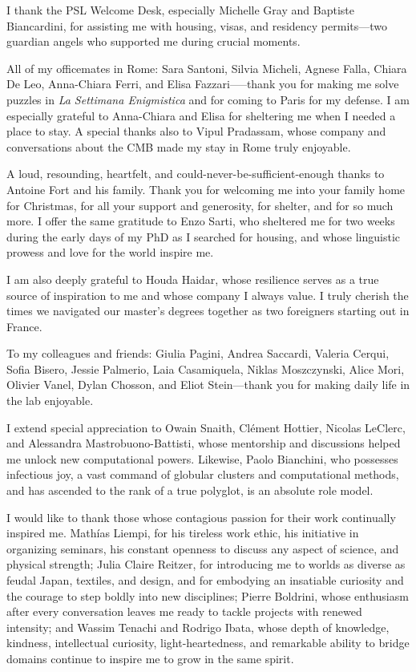 I thank the PSL Welcome Desk, especially Michelle Gray and Baptiste Biancardini, for assisting me with housing, visas, and residency permits—two guardian angels who supported me during crucial moments. 

All of my officemates in Rome: Sara Santoni, Silvia Micheli, Agnese Falla, Chiara De Leo, Anna-Chiara Ferri, and Elisa Fazzari—--thank you for making me solve puzzles in \textit{La Settimana Enigmistica} and for coming to Paris for my defense. I am especially grateful to Anna-Chiara and Elisa for sheltering me when I needed a place to stay. A special thanks also to Vipul Pradassam, whose company and conversations about the CMB made my stay in Rome truly enjoyable. 

A loud, resounding, heartfelt, and could-never-be-sufficient-enough thanks to Antoine Fort and his family. Thank you for welcoming me into your family home for Christmas, for all your support and generosity, for shelter, and for so much more. I offer the same gratitude to Enzo Sarti, who sheltered me for two weeks during the early days of my PhD as I searched for housing, and whose linguistic prowess and love for the world inspire me. 

I am also deeply grateful to Houda Haidar, whose resilience serves as a true source of inspiration to me and whose company I always value. I truly cherish the times we navigated our master's degrees together as two foreigners starting out in France. 

To my colleagues and friends: Giulia Pagini, Andrea Saccardi, Valeria Cerqui, Sofia Bisero, Jessie Palmerio, Laia Casamiquela, Niklas Moszczynski, Alice Mori, Olivier Vanel, Dylan Chosson, and Eliot Stein—thank you for making daily life in the lab enjoyable.

I extend special appreciation to Owain Snaith, Clément Hottier, Nicolas LeClerc, and Alessandra Mastrobuono-Battisti, whose mentorship and discussions helped me unlock new computational powers. Likewise, Paolo Bianchini, who possesses infectious joy, a vast command of globular clusters and computational methods, and has ascended to the rank of a true polyglot, is an absolute role model.

I would like to thank those whose contagious passion for their work continually inspired me. Mathías Liempi, for his tireless work ethic, his initiative in organizing seminars, his constant openness to discuss any aspect of science, and physical strength; Julia Claire Reitzer, for introducing me to worlds as diverse as feudal Japan, textiles, and design, and for embodying an insatiable curiosity and the courage to step boldly into new disciplines; Pierre Boldrini, whose enthusiasm after every conversation leaves me ready to tackle projects with renewed intensity; and Wassim Tenachi and Rodrigo Ibata, whose depth of knowledge, kindness, intellectual curiosity, light-heartedness, and remarkable ability to bridge domains continue to inspire me to grow in the same spirit.

